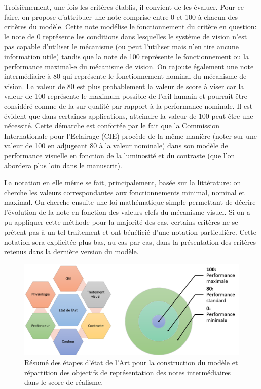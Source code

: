 	\par Troisièmement, une fois les critères établis, il convient de les évaluer. Pour ce faire, on propose d'attribuer une note comprise entre 0 et 100 à chacun des critères du modèle. Cette note modélise le fonctionnement du critère en question: le note de 0 représente les conditions dans lesquelles le système de vision n'est pas capable d'utiliser le mécanisme (ou peut l'utiliser mais n'en tire aucune information utile) tandis que la note de 100 représente le fonctionnement ou la performance maximal-e du mécanisme de vision. On rajoute également une note intermédiaire à 80 qui représente le fonctionnement nominal du mécanisme de vision. La valeur de 80 est plus probablement la valeur de score à viser car la valeur de 100 représente le maximum possible de l'œil humain et pourrait être considéré comme de la sur-qualité par rapport à la performance nominale. Il est évident que dans certaines applications, atteindre la valeur de 100 peut être une nécessité. Cette démarche est confortée par le fait que la Commission Internationale pour l'Eclairage (CIE) procède de la même manière (noter sur une valeur de 100 en adjugeant 80 à la valeur nominale) dans son modèle de performance visuelle en fonction de la luminosité et du contraste (que l'on abordera plus loin dans le manuscrit).
	
	\par La notation en elle même se fait, principalement, basée sur la littérature: on cherche les valeurs correspondantes aux fonctionnements minimal, nominal et maximal. On cherche ensuite une loi mathématique simple permettant de décrire l'évolution de la note en fonction des valeurs clefs du mécanisme visuel. Si on a pu appliquer cette méthode pour la majorité des cas, certains critères ne se prêtent pas à un tel traitement et ont bénéficié d'une notation particulière. Cette notation sera explicitée plus bas, au cas par cas, dans la présentation des critères retenus dans la dernière version du modèle.
	
	\begin{figure}
		\centering
		\includegraphics[scale=.50]{Figures/EDLAProcessScoreTarget}
		\caption{Résumé des étapes d'état de l'Art pour la construction du modèle et répartition des objectifs de représentation des notes intermédiaires dans le score de réalisme.}
		\label{fig:edla_process_score_target}
	\end{figure}
	
